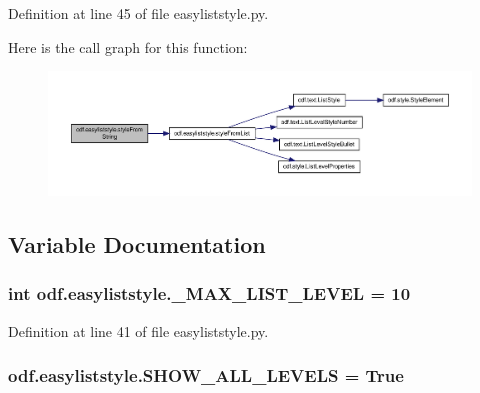 Definition at line 45 of file easyliststyle.\+py.



Here is the call graph for this function\+:
\nopagebreak
\begin{figure}[H]
\begin{center}
\leavevmode
\includegraphics[width=350pt]{namespaceodf_1_1easyliststyle_aec199f5afcac7f5d364b79acb2b435ff_cgraph}
\end{center}
\end{figure}




\subsection{Variable Documentation}
\hypertarget{namespaceodf_1_1easyliststyle_a3f16b7214e4de8fda12f391a12ca1ae3}{
\subsubsection[{\+\_\+\+M\+A\+X\+\_\+\+L\+I\+S\+T\+\_\+\+L\+E\+V\+E\+L}]{\setlength{\rightskip}{0pt plus 5cm}int odf.\+easyliststyle.\+\_\+\+M\+A\+X\+\_\+\+L\+I\+S\+T\+\_\+\+L\+E\+V\+E\+L = 10}}\label{namespaceodf_1_1easyliststyle_a3f16b7214e4de8fda12f391a12ca1ae3}


Definition at line 41 of file easyliststyle.\+py.

\hypertarget{namespaceodf_1_1easyliststyle_afe20895c55342517506d15451705548a}{
\subsubsection[{S\+H\+O\+W\+\_\+\+A\+L\+L\+\_\+\+L\+E\+V\+E\+L\+S}]{\setlength{\rightskip}{0pt plus 5cm}odf.\+easyliststyle.\+S\+H\+O\+W\+\_\+\+A\+L\+L\+\_\+\+L\+E\+V\+E\+L\+S = True}}\label{namespaceodf_1_1easyliststyle_afe20895c55342517506d15451705548a}


